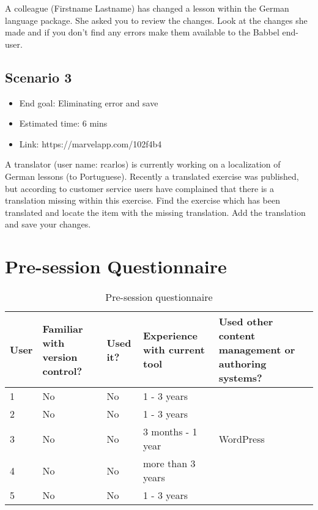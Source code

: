 A colleague (Firstname Lastname) has changed a lesson within the German language package.
She asked you to review the changes. 
Look at the changes she made and if you don’t find any errors make them available to the Babbel end-user.

\subsection{Scenario 3}
\begin{itemize}
  \item End goal: Eliminating error and save
  \item Estimated time: 6 mins
  \item Link: https://marvelapp.com/102f4b4
\end{itemize}

A translator (user name: rcarlos) is currently working on a localization of German lessons (to Portuguese). 
Recently a translated exercise was published, but according to customer service users have complained that there is a translation missing within this exercise. 
Find the exercise which has been translated and locate the item with the missing translation. 
Add the translation and save your changes.

\section{Pre-session Questionnaire} \label{append:presession-quest-1}

\begin{table}[h!]
\begin{tabular}{|l|p{3cm}|p{1.5cm}|p{2cm}|p{3cm}|}
\hline
{\bf User} & {\bf Familiar with version control?} & {\bf Used it?} & {\bf Experience with current tool} & {\bf Used other content management or authoring systems?} \\ \hline
1                 & No                                        & No                       & 1 - 3 years                        &                                                        \\ \hline
2                 & No                                        & No                       & 1 - 3 years                        &                                                        \\ \hline
3                 & No                                        & No                       & 3 months - 1 year                  & WordPress                                              \\ \hline
4                 & No                                        & No                       & more than 3 years                  &                                                        \\ \hline
5                 & No                                        & No                       & 1 - 3 years                        &                                                        \\ \hline
\end{tabular}
\centering
\caption{Pre-session questionnaire}
\label{table:pre-sess-quest}
\end{table}
